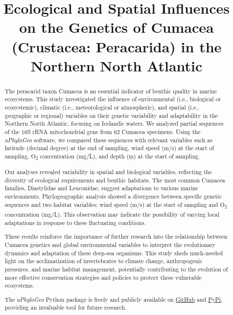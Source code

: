 \title[Ecological & Spatial Influences on the Genetics of Cumacea in N. Atlantic]{Ecological and Spatial Influences on the Genetics of Cumacea (Crustacea: Peracarida) in the Northern North Atlantic}

\begin{abstract}
The peracarid taxon Cumacea is an essential indicator of benthic quality in marine ecosystems. This study investigated the influence of environmental (i.e., biological or ecosystemic), climatic (i.e., meteorological or atmospheric), and spatial (i.e., geographic or regional) variables on their genetic variability and adaptability in the Northern North Atlantic, focusing on Icelandic waters. We analyzed partial sequences of the 16S rRNA mitochondrial gene from 62 Cumacea specimens. Using the \textit{aPhyloGeo} software, we compared these sequences with relevant variables such as latitude (decimal degree) at the end of sampling, wind speed (m/s) at the start of sampling, O\textsubscript{2} concentration (mg/L), and depth (m) at the start of sampling.

Our analyses revealed variability in spatial and biological variables, reflecting the diversity of ecological requirements and benthic habitats. The most common Cumacea families, Diastylidae and Leuconidae, suggest adaptations to various marine environments. Phylogeographic analysis showed a divergence between specific genetic sequences and two habitat variables: wind speed (m/s) at the start of sampling and O\textsubscript{2} concentration (mg/L). This observation may indicate the possibility of varying local adaptations in response to these fluctuating conditions.

These results reinforce the importance of further research into the relationship between Cumacea genetics and global environmental variables to interpret the evolutionary dynamics and adaptation of these deep-sea organisms. This study sheds much-needed light on the acclimatization of invertebrates to climate change, anthropogenic pressures, and marine habitat management, potentially contributing to the evolution of more effective conservation strategies and policies to protect these vulnerable ecosystems.

The \textit{aPhyloGeo} Python package is freely and publicly available on \href{https://github.com/tahiri-lab/aPhyloGeo}{GitHub} and \href{https://pypi.org/project/aphylogeo/}{PyPi}, providing an invaluable tool for future research.
\end{abstract}

